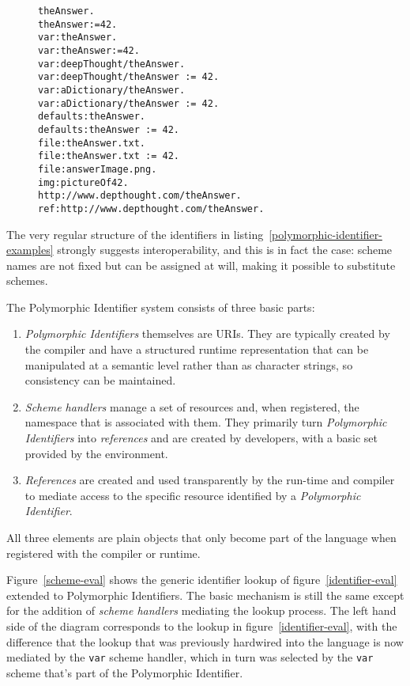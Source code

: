 \documentclass[preprint,authoryear]{llncs}
\begin{document}
\begin{figure}[htbp]
\begin{lstlisting}[style=numbers,label=polymorphic-identifier-examples,caption=Some variants of Polymorphic Identifiers.]
theAnswer.
theAnswer:=42.
var:theAnswer.
var:theAnswer:=42.
var:deepThought/theAnswer.
var:deepThought/theAnswer := 42.
var:aDictionary/theAnswer.
var:aDictionary/theAnswer := 42.
defaults:theAnswer.
defaults:theAnswer := 42.
file:theAnswer.txt.
file:theAnswer.txt := 42.
file:answerImage.png.
img:pictureOf42.
http://www.depthought.com/theAnswer.
ref:http://www.depthought.com/theAnswer.
\end{lstlisting}
\end{figure}

The very regular structure of the identifiers in listing~\ref{polymorphic-identifier-examples} strongly
suggests interoperability, and this is in fact the case:  scheme names are not fixed but can be
assigned at will, making it possible to substitute schemes.

The Polymorphic Identifier system consists of three basic parts:
\begin{enumerate}
\item \emph{Polymorphic Identifiers} themselves are URIs.  They are typically created by the 
	compiler and have a structured runtime representation that can be manipulated
	at a semantic level rather than as character strings, so consistency can be 
	maintained.
\item \emph{Scheme handlers} manage a set of resources and, when registered,
	 the namespace that is associated
	with them.  They primarily turn \emph{Polymorphic Identifiers} into \emph{references} and
	are created by developers, with a basic set provided by the environment.
\item \emph{References} are created and used transparently by the run-time and compiler
	to mediate access to the specific resource identified by a \emph{Polymorphic Identifier}.
	
	
\end{enumerate}

All three elements are plain objects that only become part of the language when registered
with the compiler or runtime.

Figure~\ref{scheme-eval} shows the generic identifier lookup of figure~\ref{identifier-eval}
extended to Polymorphic Identifiers.  The basic mechanism is still the same except for the
addition of \emph{scheme handlers} mediating the lookup process.  The left hand side of the
diagram corresponds to the lookup in figure~\ref{identifier-eval}, with the difference that
the lookup that was previously hardwired into the language is now mediated by the {\tt var}
scheme handler, which in turn was selected by the {\tt var} scheme that's part of the 
Polymorphic Identifier.
\end{document}
